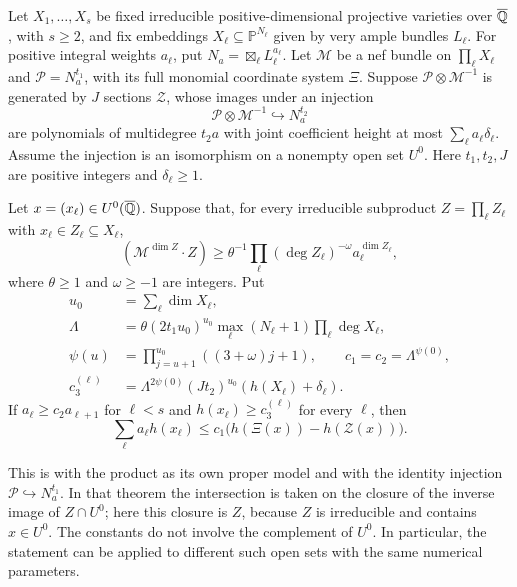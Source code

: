 \begin{theorem}[Dill]\label{thm:dill-form}
Let $X_1,\ldots,X_s$ be fixed irreducible positive-dimensional
projective varieties over $\overline{\mathbb Q}$, with $s\ge2$, and fix embeddings
$X_\ell\subseteq\mathbb P^{N_\ell}$ given by very ample bundles
$L_\ell$.  For positive integral weights $a_\ell$, put
$N_a=\boxtimes_\ell L_\ell^{a_\ell}$.
Let $\mathcal M$ be a nef bundle on $\prod_\ell X_\ell$ and
$\mathcal P=N_a^{t_1}$, with its full monomial coordinate system $\Xi$.
Suppose $\mathcal P\otimes\mathcal M^{-1}$ is generated by $J$ sections
$\mathcal Z$, whose images under an injection
\[
 \mathcal P\otimes\mathcal M^{-1}\hookrightarrow N_a^{t_2}
\]
are polynomials of multidegree $t_2a$ with joint coefficient height at
most $\sum_\ell a_\ell\delta_\ell$.  Assume the injection is an
isomorphism on a nonempty open set $U^0$.  Here $t_1,t_2,J$ are positive
integers and $\delta_\ell\ge1$.

Let $x=(x_\ell)\in U^0(\overline{\mathbb Q})$.  Suppose that, for every irreducible
subproduct $Z=\prod_\ell Z_\ell$ with $x_\ell\in Z_\ell\subseteq X_\ell$,
\begin{equation}\label{eq:dill-intersections}
 (\mathcal M^{\dim Z}\cdot Z)
 \ge \theta^{-1}\prod_\ell
       (\deg Z_\ell)^{-\omega}a_\ell^{\dim Z_\ell},
\end{equation}
where $\theta\ge1$ and $\omega\ge-1$ are integers.  Put
\[
 \begin{split}
 u_0&=\sum_\ell\dim X_\ell,\\
 \Lambda&=\theta(2t_1u_0)^{u_0}
          \max_\ell(N_\ell+1)\prod_\ell\deg X_\ell,\\
 \psi(u)&=\prod_{j=u+1}^{u_0}((3+\omega)j+1),
 \qquad c_1=c_2=\Lambda^{\psi(0)},\\
 c_3^{(\ell)}&=\Lambda^{2\psi(0)}(Jt_2)^{u_0}
                      (h(X_\ell)+\delta_\ell).
 \end{split}
\]
If $a_\ell\ge c_2a_{\ell+1}$ for $\ell<s$ and
$h(x_\ell)\ge c_3^{(\ell)}$ for every $\ell$, then
\begin{equation}\label{eq:dill-height}
 \sum_\ell a_\ell h(x_\ell)
 \le c_1\bigl(h(\Xi(x))-h(\mathcal Z(x))\bigr).
\end{equation}
\end{theorem}

This is \cite[Theorem~1.1]{Dill2020} with the product as its own proper
model and with the identity injection
$\mathcal P\hookrightarrow N_a^{t_1}$.  In that theorem the intersection
is taken on the closure of the inverse image of $Z\cap U^0$; here this
closure is $Z$, because $Z$ is irreducible and contains $x\in U^0$.
The constants do not involve the complement of $U^0$.  In particular,
the statement can be applied to different such open sets with the same
numerical parameters.

